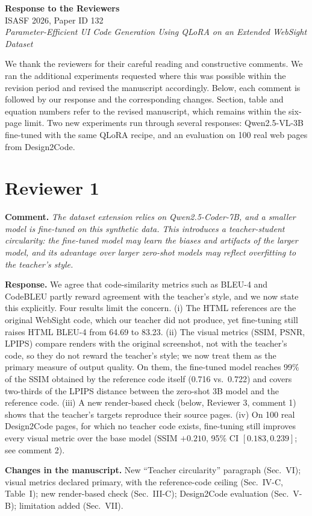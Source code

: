 \documentclass[11pt,a4paper]{article}
\newcommand{\rev}[1]{\par\noindent\textbf{Comment.} \textit{#1}\par}
\newcommand{\resp}{\par\noindent\textbf{Response.} }
\newcommand{\change}[1]{\par\noindent\textbf{Changes in the manuscript.} #1\par\medskip}
\begin{document}
\begin{center}
{\Large\textbf{Response to the Reviewers}}\\[4pt]
ISASF 2026, Paper ID 132\\
\textit{Parameter-Efficient UI Code Generation Using QLoRA on an Extended WebSight Dataset}
\end{center}

We thank the reviewers for their careful reading and constructive comments. We
ran the additional experiments requested where this was possible within the
revision period and revised the manuscript accordingly. Below, each comment is
followed by our response and the corresponding changes. Section, table and
equation numbers refer to the revised manuscript, which remains within the
six-page limit. Two new experiments run through several responses: Qwen2.5-VL-3B
fine-tuned with the same QLoRA recipe, and an evaluation on 100 real web pages
from Design2Code.

\section*{Reviewer 1}

\rev{The dataset extension relies on Qwen2.5-Coder-7B, and a smaller model is
fine-tuned on this synthetic data. This introduces a teacher-student circularity:
the fine-tuned model may learn the biases and artifacts of the larger model, and
its advantage over larger zero-shot models may reflect overfitting to the
teacher's style.}
\resp We agree that code-similarity metrics such as BLEU-4 and CodeBLEU partly
reward agreement with the teacher's style, and we now state this explicitly. Four
results limit the concern. (i) The HTML references are the original WebSight
code, which our teacher did not produce, yet fine-tuning still raises HTML
BLEU-4 from 64.69 to 83.23. (ii) The visual metrics (SSIM, PSNR, LPIPS) compare
renders with the original screenshot, not with the teacher's code, so they do
not reward the teacher's style; we now treat them as the primary measure of
output quality. On them, the fine-tuned model reaches 99\% of the SSIM obtained by
the reference code itself (0.716 vs.\ 0.722) and covers two-thirds of the LPIPS
distance between the zero-shot 3B model and the reference code. (iii) A new
render-based check (below, Reviewer 3, comment 1) shows that the teacher's
targets reproduce their source pages. (iv) On 100 real Design2Code pages, for
which no teacher code exists, fine-tuning still improves every visual metric
over the base model (SSIM $+0.210$, 95\% CI $[0.183, 0.239]$; see comment 2).
\change{New ``Teacher circularity'' paragraph (Sec.~VI); visual metrics declared
primary, with the reference-code ceiling (Sec.~IV-C, Table~I); new render-based
check (Sec.~III-C); Design2Code evaluation (Sec.~V-B); limitation added
(Sec.~VII).}
\end{document}

